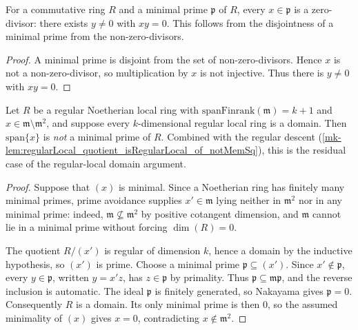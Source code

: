 \begin{lemma}\label{mk-lem:exists_ne_zero_mul_eq_zero_of_mem_minimalPrimes}
  \leanok

  For a commutative ring \(R\) and a minimal prime \(\mathfrak p\) of \(R\), every
  \(x \in \mathfrak p\) is a zero-divisor: there exists \(y \neq 0\) with \(x y = 0\). This
  follows from the disjointness of a minimal prime from the non-zero-divisors.
\end{lemma}
\begin{proof}
  \leanok

A minimal prime is disjoint from the set of non-zero-divisors. Hence
  \(x\) is not a non-zero-divisor, so multiplication by \(x\) is not
  injective. Thus there is \(y\neq0\) with \(xy=0\).
\end{proof}

\begin{lemma}\label{mk-lem:notMem_minimalPrimes_of_regularLocal_succ}
  \leanok

  Let \(R\) be a regular Noetherian local ring with \(\text{spanFinrank}(\mathfrak m) = k + 1\)
  and \(x \in \mathfrak m \setminus \mathfrak m^2\), and suppose every \(k\)-dimensional regular
  local ring is a domain. Then \(\text{span}\{x\}\) is \emph{not} a minimal prime of \(R\).
  Combined with the regular descent
  (\ref{mk-lem:regularLocal_quotient_isRegularLocal_of_notMemSq}), this is the residual
  case of the regular-local domain argument.
\end{lemma}
\begin{proof}
  \leanok

Suppose that \((x)\) is minimal. Since a Noetherian ring has finitely many
  minimal primes, prime avoidance supplies
  \(x'\in\mathfrak m\) lying neither in \(\mathfrak m^2\) nor in any minimal
  prime: indeed, \(\mathfrak m\not\subseteq\mathfrak m^2\) by positive
  cotangent dimension, and \(\mathfrak m\) cannot lie in a minimal prime
  without forcing \(\dim(R)=0\).

  The quotient \(R/(x')\) is regular of dimension \(k\), hence a domain by
  the inductive hypothesis, so \((x')\) is prime. Choose a minimal prime
  \(\mathfrak p\subseteq(x')\). Since \(x'\notin\mathfrak p\), every
  \(y\in\mathfrak p\), written \(y=x'z\), has \(z\in\mathfrak p\) by
  primality. Thus \(\mathfrak p\subseteq\mathfrak m\mathfrak p\), and the
  reverse inclusion is automatic. The ideal \(\mathfrak p\) is finitely
  generated, so Nakayama gives \(\mathfrak p=0\). Consequently \(R\) is a
  domain. Its only minimal prime is then \(0\), so the assumed minimality of
  \((x)\) gives \(x=0\), contradicting \(x\notin\mathfrak m^2\).
\end{proof}

